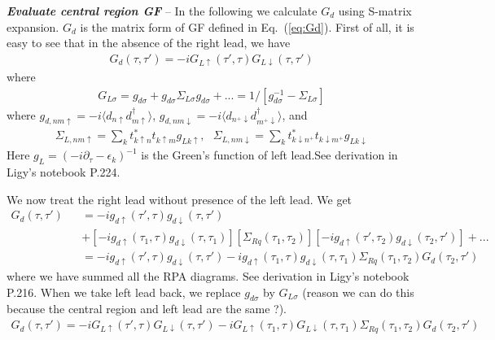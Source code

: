 \documentclass[aps,prb,superscriptaddress]{revtex4-2}
\begin{document}
{\noindent \textbf{\textit{Evaluate central region GF}}} -- In the following we calculate $G_{d}$ using S-matrix expansion. $G_d$ is the matrix form of GF defined in Eq.~(\ref{eq:Gd}). First of all, it is easy to see that in the absence of the right lead, we have
\begin{eqnarray}
G_{d}(\tau,\tau') = -i G_{L\uparrow}(\tau',\tau)G_{L\downarrow}(\tau,\tau') \nonumber
\end{eqnarray}
where
\begin{eqnarray}
G_{L\sigma} = g_{d\sigma} + g_{d\sigma} \Sigma_{L\sigma} g_{d\sigma} +... =1/[g_{d\sigma}^{-1} -  \Sigma_{L\sigma}] \nonumber
\end{eqnarray}
where $g_{d,nm\uparrow} = -i\langle d_{n\uparrow} d^\dagger_{m\uparrow} \rangle$, $g_{d,nm\downarrow} = -i\langle d_{n^+\downarrow} d^\dagger_{m^+\downarrow} \rangle$, and
\begin{eqnarray}
\Sigma_{L,nm\uparrow} = \sum_{k} t^*_{k\uparrow n} t_{k\uparrow m} g_{Lk\uparrow}, ~~~ \Sigma_{L,nm\downarrow} = \sum_{k} t^*_{k\downarrow n^+} t_{k\downarrow m^+} g_{Lk\downarrow} \label{self1}
\end{eqnarray}
Here $g_{L}=(-i\partial_{\tau} -\epsilon_{k})^{-1}$ is the Green’s function of left lead.See derivation in Ligy's notebook P.224.

We now treat the right lead without presence of the left lead. We get
\begin{eqnarray}
G_{d}(\tau,\tau') &&= -i g_{d\uparrow}(\tau',\tau)g_{d\downarrow}(\tau,\tau') \nonumber \\
&&+  [-i g_{d\uparrow}(\tau_1,\tau)g_{d\downarrow}(\tau,\tau_1)] [\Sigma_{Rq}(\tau_1,\tau_2)] [-ig_{d\uparrow}(\tau',\tau_2)g_{d\downarrow}(\tau_2,\tau')] +... \nonumber \\
&&=-i g_{d\uparrow}(\tau',\tau)g_{d\downarrow}(\tau,\tau') -ig_{d\uparrow}(\tau_1,\tau)g_{d\downarrow}(\tau,\tau_1) \Sigma_{Rq}(\tau_1,\tau_2) G_{d}(\tau_2,\tau') \label{relation2}
\end{eqnarray}
where we have summed all the RPA diagrams. See derivation in Ligy's notebook P.216. When we take left lead back, we replace $g_{d\sigma}$ by $G_{L\sigma}$ (reason we can do this because the central region and left lead are the same ?).
\begin{eqnarray}
G_{d}(\tau,\tau') = -iG_{L\uparrow}(\tau',\tau)G_{L\downarrow}(\tau,\tau') -i G_{L\uparrow}(\tau_1,\tau)G_{L\downarrow}(\tau,\tau_1) \Sigma_{Rq}(\tau_1,\tau_2) G_{d}(\tau_2,\tau') \label{relation3}
\end{eqnarray}
\end{document}
